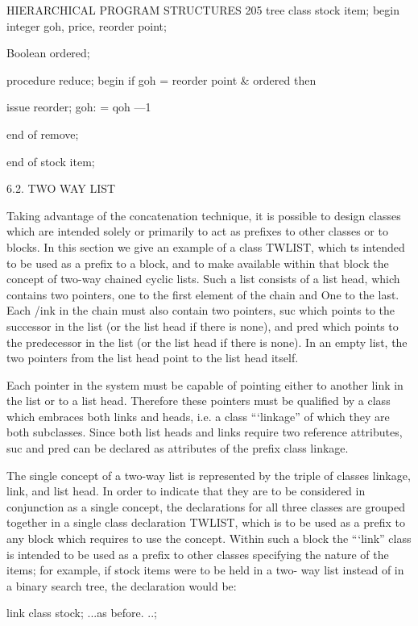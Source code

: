 {{{{{		HIERARCHICAL PROGRAM STRUCTURES 205 tree class stock item; begin integer goh, price, reorder point;
		
		Boolean ordered;
		
		procedure reduce; begin if goh = reorder point & ordered then
		
		issue reorder; goh: = qoh —1
		
		end of remove;
		
		end of stock item;
		
		6.2. TWO WAY LIST
		
		Taking advantage of the concatenation technique, it is possible to design classes which are intended solely or primarily to act as prefixes to other classes or to blocks. In this section we give an example of a class TWLIST, which ts intended to be used as a prefix to a block, and to make available within that block the concept of two-way chained cyclic lists. Such a list consists of a list head, which contains two pointers, one to the first element of the chain and One to the last. Each /ink in the chain must also contain two pointers, suc which points to the successor in the list (or the list head if there is none), and pred which points to the predecessor in the list (or the list head if there is none). In an empty list, the two pointers from the list head point to the list head itself.
		
		Each pointer in the system must be capable of pointing either to another link in the list or to a list head. Therefore these pointers must be qualified by a class which embraces both links and heads, i.e. a class “‘linkage” of which they are both subclasses. Since both list heads and links require two reference attributes, suc and pred can be declared as attributes of the prefix class linkage.
		
		The single concept of a two-way list is represented by the triple of classes linkage, link, and list head. In order to indicate that they are to be considered in conjunction as a single concept, the declarations for all three classes are grouped together in a single class declaration TWLIST, which is to be used as a prefix to any block which requires to use the concept. Within such a block the “‘link” class is intended to be used as a prefix to other classes specifying the nature of the items; for example, if stock items were to be held in a two- way list instead of in a binary search tree, the declaration would be:
		
		link class stock; ...as before. ..;
		
}}}}}
